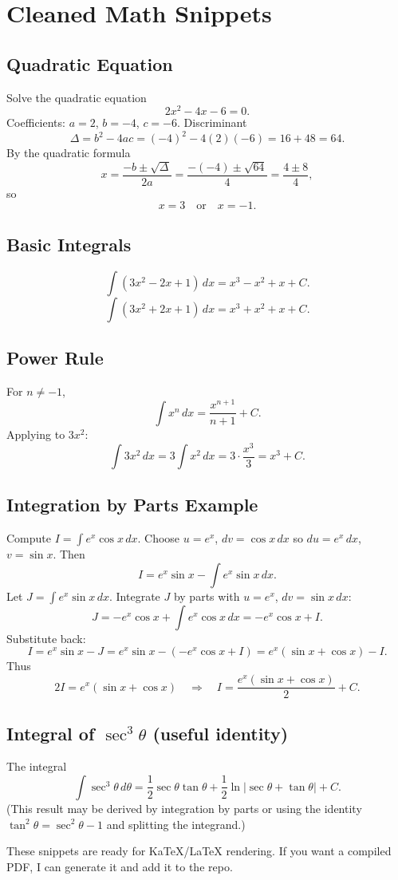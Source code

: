 \documentclass{article}
\begin{document}
\section*{Cleaned Math Snippets}

\subsection*{Quadratic Equation}
Solve the quadratic equation
\[2x^{2}-4x-6=0.\]
Coefficients: $a=2$, $b=-4$, $c=-6$. Discriminant
\[\Delta=b^{2}-4ac=(-4)^{2}-4(2)(-6)=16+48=64.\]
By the quadratic formula
\[x=\frac{-b\pm\sqrt{\Delta}}{2a}=\frac{-(-4)\pm\sqrt{64}}{4}=\frac{4\pm8}{4},\]
so
\[\boxed{x=3\quad\text{or}\quad x=-1.}\]

\subsection*{Basic Integrals}
\[\int(3x^{2}-2x+1)\,dx = x^{3}-x^{2}+x+C.\]
\[\int(3x^{2}+2x+1)\,dx = x^{3}+x^{2}+x+C.\]

\subsection*{Power Rule}
For $n\neq -1$,
\[\int x^{n}\,dx=\frac{x^{n+1}}{n+1}+C.\]
Applying to $3x^{2}$:
\[\int 3x^{2}\,dx = 3\int x^{2}\,dx = 3\cdot\frac{x^{3}}{3}=x^{3}+C.\]

\subsection*{Integration by Parts Example}
Compute $I=\int e^{x}\cos x\,dx$.
Choose $u=e^{x}$, $dv=\cos x\,dx$ so $du=e^{x}\,dx$, $v=\sin x$. Then
\[I=e^{x}\sin x-\int e^{x}\sin x\,dx.\]
Let $J=\int e^{x}\sin x\,dx$. Integrate $J$ by parts with $u=e^{x}$, $dv=\sin x\,dx$:
\[J=-e^{x}\cos x+\int e^{x}\cos x\,dx = -e^{x}\cos x + I.\]
Substitute back:
\[I=e^{x}\sin x - J = e^{x}\sin x -(-e^{x}\cos x + I) = e^{x}(\sin x + \cos x) - I.\]
Thus
\[2I = e^{x}(\sin x + \cos x)\quad\Rightarrow\quad I=\frac{e^{x}(\sin x + \cos x)}{2} + C.\]

\subsection*{Integral of $\sec^{3}\theta$ (useful identity)}
The integral
\[\int \sec^{3}\theta\,d\theta = \frac{1}{2}\sec\theta\tan\theta + \frac{1}{2}\ln|\sec\theta + \tan\theta| + C.\]
(This result may be derived by integration by parts or using the identity $\tan^{2}\theta=\sec^{2}\theta-1$ and splitting the integrand.)

\vspace{1em}
\noindent These snippets are ready for KaTeX/LaTeX rendering. If you want a compiled PDF, I can generate it and add it to the repo.
\end{document}
